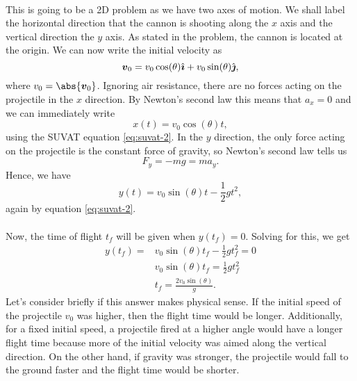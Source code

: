 \documentclass[../classical_mechanics.tex]{subfiles}
\begin{document}
        \paragraph{}
        This is going to be a 2D problem as we have two axes of motion.
        We shall label the horizontal direction that the cannon is shooting along the $x$ axis and the vertical direction the $y$ axis.
        As stated in the problem, the cannon is located at the origin.
        We can now write the initial velocity as
        \begin{equation}
            \boldsymbol{v}_0 = v_0\cos(\theta)\hat{\boldsymbol{\imath}} + v_0\sin(\theta)\hat{\boldsymbol{\jmath}},
        \end{equation}
        where $v_0=\abs{\vec{v}_0}$.
        Ignoring air resistance, there are no forces acting on the projectile in the $x$ direction.
        By Newton's second law this means that $a_x=0$ and we can immediately write
        \begin{equation}
            x(t) = v_0\cos(\theta)t,
        \end{equation}
        using the SUVAT equation \ref{eq:suvat-2}.
        In the $y$ direction, the only force acting on the projectile is the constant force of gravity, so Newton's second law tells us
        \begin{equation}
            F_y = -mg = ma_y.
        \end{equation}
        Hence, we have
        \begin{equation}
            y(t) = v_0\sin(\theta)t - \frac{1}{2}gt^2,
        \end{equation}
        again by equation \ref{eq:suvat-2}.

        \paragraph{}
        Now, the time of flight $t_f$ will be given when $y(t_f)=0$.
        Solving for this, we get
        \begin{align}
            y(t_f) = &v_0\sin(\theta)t_f - \frac{1}{2}gt_f^2 = 0\\
            &v_0\sin(\theta)t_f = \frac{1}{2}gt_f^2\\
            &t_f = \frac{2v_0\sin(\theta)}{g}.
        \end{align}
        Let's consider briefly if this answer makes physical sense.
        If the initial speed of the projectile $v_0$ was higher, then the flight time would be longer.
        Additionally, for a fixed initial speed, a projectile fired at a higher angle would have a longer flight time because more of the initial velocity was aimed along the vertical direction.
        On the other hand, if gravity was stronger, the projectile would fall to the ground faster and the flight time would be shorter.
\end{document}
